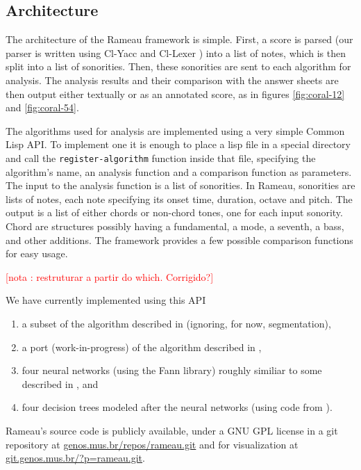 \documentclass{article}
\newcounter{notacounter}
\newcommand{\nota}[1]{
  \addtocounter{notacounter}{1}
  \textcolor{red}{[nota \arabic{notacounter}: #1]}
}
\begin{document}
\subsection{Architecture}
\label{sec:architecture-and-api}

The architecture of the Rameau framework is simple. First, a score is
parsed (our parser is written using Cl-Yacc
\cite{chroboczek:_cl_yacc_manual} and Cl-Lexer
\cite{parker:_lexer_packag}) into a list of notes, which is then split
into a list of sonorities. Then, these sonorities are sent to each
algorithm for analysis. The analysis results and their comparison with
the answer sheets are then output either textually or as an annotated
score, as in figures \ref{fig:coral-12} and \ref{fig:coral-54}.

The algorithms used for analysis are implemented using a very simple
Common Lisp API. To implement one it is enough to place a lisp file in
a special directory and call the \texttt{register-algorithm} function
inside that file, specifying the algorithm's name, an analysis
function and a comparison function as parameters. The input to the
analysis function is a list of sonorities. In Rameau, sonorities are
lists of notes, each note specifying its onset time, duration, octave
and pitch. The output is a list of either chords or non-chord tones,
one for each input sonority. Chord are structures possibly having a
fundamental, a mode, a seventh, a bass, and other additions. The
framework provides a few possible comparison functions for easy
usage. \nota{restruturar a partir do which. Corrigido?}

We have currently implemented using this API 
\begin{enumerate}
\item a subset of the algorithm described in \cite{pardo02:algorithms}
  (ignoring, for now, segmentation), 
\item a port (work-in-progress) of the algorithm described in
  \cite{temperley99:modeling}, 
\item four neural networks (using the Fann \cite{nissen:fann}
  library) roughly similiar to some described in
  \cite{tsui02:_harmon_analy_using_neural_networ}, and
\item four decision trees modeled after the neural networks (using code
  from \cite{Mitchell:1997:ML}).
\end{enumerate}

Rameau's source code is publicly available, under a GNU GPL
\cite{fsf:gpl} license in a git \cite{baudis:_git_users_manual}
repository at \url{genos.mus.br/repos/rameau.git} and for
visualization at \url{git.genos.mus.br/?p=rameau.git}.
\end{document}
